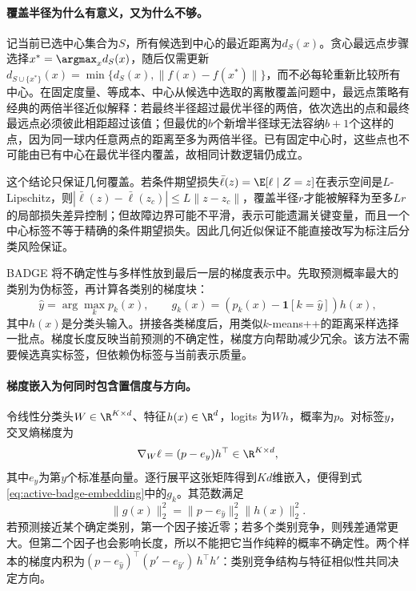 \paragraph{覆盖半径为什么有意义，又为什么不够。}
记当前已选中心集合为$S$，所有候选到中心的最近距离为$d_S(x)$。贪心最远点步骤选择$x^*=\argmax_xd_S(x)$，随后仅需更新$d_{S\cup\{x^*\}}(x)=\min\{d_S(x),\|f(x)-f(x^*)\|\}$，而不必每轮重新比较所有中心。在固定度量、等成本、中心从候选中选取的离散覆盖问题中，最远点策略有经典的两倍半径近似解释：若最终半径超过最优半径的两倍，依次选出的点和最终最远点必须彼此相距超过该值；但最优的$b$个新增半径球无法容纳$b+1$个这样的点，因为同一球内任意两点的距离至多为两倍半径。已有固定中心时，这些点也不可能由已有中心在最优半径内覆盖，故相同计数逻辑仍成立。

这个结论只保证几何覆盖。若条件期望损失$\bar\ell(z)=\E[\ell\mid Z=z]$在表示空间是$L$-Lipschitz，则$|\bar\ell(z)-\bar\ell(z_c)|\leq L\|z-z_c\|$，覆盖半径$r$才能被解释为至多$Lr$的局部损失差异控制；但故障边界可能不平滑，表示可能遗漏关键变量，而且一个中心标签不等于精确的条件期望损失。因此几何近似保证不能直接改写为标注后分类风险保证。

BADGE 将不确定性与多样性放到最后一层的梯度表示中\cite{ash2020badge}。先取预测概率最大的类别为伪标签，再计算各类别的梯度块：
\begin{equation}
 \hat y=\arg\max_kp_k(x),\qquad
 g_k(x)=(p_k(x)-\mathbf1[k=\hat y])h(x),\label{eq:active-badge-embedding}
\end{equation}
其中$h(x)$是分类头输入。拼接各类梯度后，用类似$k$-means++的距离采样选择一批点。梯度长度反映当前预测的不确定性，梯度方向帮助减少冗余。该方法不需要候选真实标签，但依赖伪标签与当前表示质量。

\paragraph{梯度嵌入为何同时包含置信度与方向。}
令线性分类头$W\in\R^{K\times d}$、特征$h(x)\in\R^d$，logits 为$Wh$，概率为$p$。对标签$y$，交叉熵梯度为
\begin{equation}
 \nabla_W\ell=(p-e_y)h^\top\in\R^{K\times d},
\end{equation}
其中$e_y$为第$y$个标准基向量。逐行展平这张矩阵得到$Kd$维嵌入，便得到式\eqref{eq:active-badge-embedding}中的$g_k$。其范数满足
\begin{equation}
 \|g(x)\|_2^2=\|p-e_{\hat y}\|_2^2\|h(x)\|_2^2.
\end{equation}
若预测接近某个确定类别，第一个因子接近零；若多个类别竞争，则残差通常更大。但第二个因子也会影响长度，所以不能把它当作纯粹的概率不确定性。两个样本的梯度内积为$(p-e_{\hat y})^\top(p'-e_{\hat y'})\,h^\top h'$：类别竞争结构与特征相似性共同决定方向。

